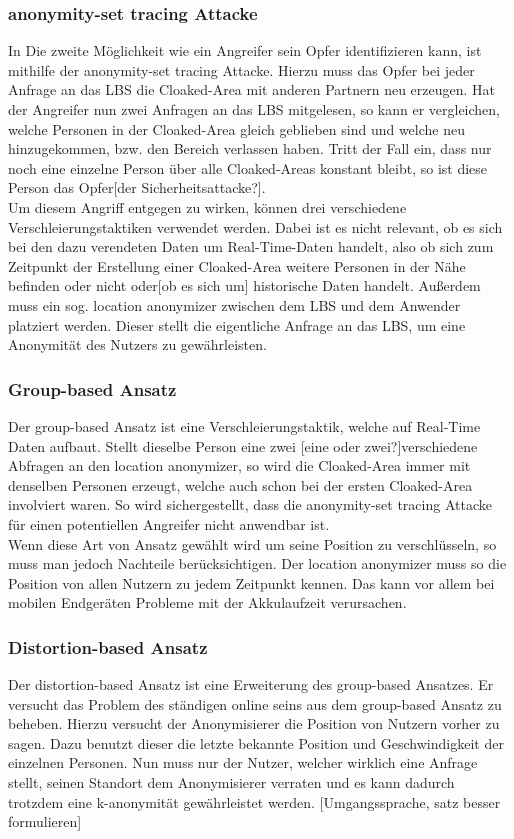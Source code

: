 \subsubsection{anonymity-set tracing Attacke} 
In \cite{chow2007} Die zweite Möglichkeit wie ein Angreifer sein Opfer identifizieren kann, ist mithilfe der anonymity-set tracing Attacke. Hierzu muss das Opfer bei jeder Anfrage an das LBS die Cloaked-Area mit anderen Partnern neu erzeugen. Hat der Angreifer nun zwei Anfragen an das LBS mitgelesen, so kann er vergleichen, welche Personen in der Cloaked-Area gleich geblieben sind und welche neu hinzugekommen, bzw. den Bereich verlassen haben. Tritt der Fall ein, dass nur noch eine einzelne Person über alle Cloaked-Areas konstant bleibt, so ist diese Person das Opfer[der Sicherheitsattacke?].\\ Um diesem Angriff entgegen zu wirken, können drei verschiedene Verschleierungstaktiken verwendet werden. Dabei ist es nicht relevant, ob es sich bei den dazu verendeten Daten um Real-Time-Daten handelt, also ob sich zum Zeitpunkt der Erstellung einer Cloaked-Area weitere Personen in der Nähe befinden oder nicht oder[ob es sich um] historische Daten handelt. Außerdem muss ein sog. location anonymizer zwischen dem LBS und dem Anwender platziert werden. Dieser stellt die eigentliche Anfrage an das LBS, um eine Anonymität des Nutzers zu gewährleisten. 
\subsubsection{Group-based Ansatz} 
Der group-based Ansatz ist eine Verschleierungstaktik, welche auf Real-Time Daten aufbaut. Stellt dieselbe Person eine zwei [eine oder zwei?]verschiedene Abfragen an den location anonymizer, so wird die Cloaked-Area immer mit denselben Personen erzeugt, welche auch schon bei der ersten Cloaked-Area involviert waren. So wird sichergestellt, dass die anonymity-set tracing Attacke für einen potentiellen Angreifer nicht anwendbar ist.\\Wenn diese Art von Ansatz gewählt wird um seine Position zu verschlüsseln, so muss man jedoch Nachteile berücksichtigen. Der location anonymizer muss so die Position von allen Nutzern zu jedem Zeitpunkt kennen. Das kann vor allem bei mobilen Endgeräten Probleme mit der Akkulaufzeit verursachen.  
\subsubsection{Distortion-based Ansatz} 
Der distortion-based Ansatz ist eine Erweiterung des group-based Ansatzes. Er versucht das Problem des ständigen online seins aus dem group-based Ansatz zu beheben. Hierzu versucht der Anonymisierer die Position von Nutzern vorher zu sagen. Dazu benutzt dieser die letzte bekannte Position und Geschwindigkeit der einzelnen Personen. Nun muss nur der Nutzer, welcher wirklich eine Anfrage stellt, seinen Standort dem Anonymisierer verraten und es kann dadurch trotzdem eine k-anonymität gewährleistet werden. [Umgangssprache, satz besser formulieren] 
